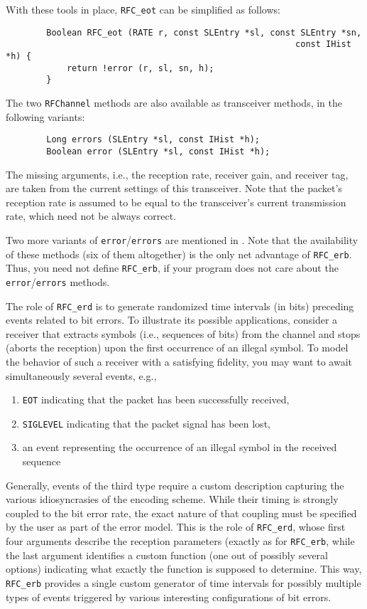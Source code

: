 With these tools in place, {\tt RFC\_eot} can be simplified as follows:
\begin{verbatim}
        Boolean RFC_eot (RATE r, const SLEntry *sl, const SLEntry *sn,
                                                         const IHist *h) {
            return !error (r, sl, sn, h);
        }
\end{verbatim}

The two {\tt RFChannel} methods are also available as transceiver
methods, in the following variants:
\begin{verbatim}
        Long errors (SLEntry *sl, const IHist *h);
        Boolean error (SLEntry *sl, const IHist *h);
\end{verbatim}
\noindent
The missing arguments, i.e., the reception rate, receiver gain, and
receiver tag,
are taken from the current settings of this transceiver.
Note that the packet's 
reception rate is assumed to be equal to the transceiver's current
transmission rate, which need not be always correct.

Two more variants of {\tt error}/{\tt errors} are mentioned in 
.
Note that the availability of
these methods (six of them altogether)
is the only net advantage of {\tt RFC\_erb}.
Thus, you need not define {\tt RFC\_erb}, if your
program does not care about the {\tt error}/{\tt errors} methods.

The role of {\tt RFC\_erd} is to generate randomized time intervals (in bits)
preceding events related to bit errors.
To illustrate its possible applications, consider a receiver that extracts
symbols (i.e., sequences of bits) from the channel and stops (aborts the
reception) upon the first occurrence of an illegal symbol.
To model the behavior of such a receiver with a satisfying fidelity, you may
want to await simultaneously several events, e.g.,
\begin{enumerate}
\item
{\tt EOT} indicating that the packet has been successfully received,
\item
{\tt SIGLEVEL} indicating that the packet signal has been lost,
\item
an event representing the occurrence of an illegal symbol in the received
sequence
\end{enumerate}

Generally, events of the third type require a custom description capturing
the various idiosyncrasies of the encoding scheme.
While their timing is strongly coupled to the bit error rate, the exact
nature of that coupling must be specified by the user as part of the 
error model.
This is the role of {\tt RFC\_erd}, whose first four arguments describe the
reception parameters (exactly as for {\tt RFC\_erb}, while the last argument
identifies a custom function (one out of possibly several options) indicating
what exactly the function is supposed to determine.
This way, {\tt RFC\_erb} provides a single custom generator of time intervals
for possibly multiple types of events triggered by various interesting
configurations of bit errors.

